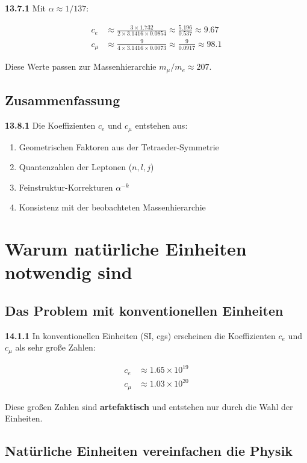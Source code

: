\documentclass[12pt,a4paper]{article}
\begin{document}
\noindent \textbf{13.7.1} Mit $\alpha \approx 1/137$:

\begin{align*}
	c_e &\approx \frac{3 \times 1.732}{2 \times 3.1416 \times 0.0854} \approx \frac{5.196}{0.537} \approx 9.67 \\
	c_\mu &\approx \frac{9}{4 \times 3.1416 \times 0.0073} \approx \frac{9}{0.0917} \approx 98.1
\end{align*}

Diese Werte passen zur Massenhierarchie $m_\mu/m_e \approx 207$.

\subsection{Zusammenfassung}

\noindent \textbf{13.8.1} Die Koeffizienten $c_e$ und $c_\mu$ entstehen aus:
\begin{enumerate}
	\item Geometrischen Faktoren aus der Tetraeder-Symmetrie
	\item Quantenzahlen der Leptonen ($n,l,j$)
	\item Feinstruktur-Korrekturen $\alpha^{-k}$
	\item Konsistenz mit der beobachteten Massenhierarchie
\end{enumerate}


\section{Warum natürliche Einheiten notwendig sind}

\subsection{Das Problem mit konventionellen Einheiten}

\noindent \textbf{14.1.1} In konventionellen Einheiten (SI, cgs) erscheinen die Koeffizienten $c_e$ und $c_\mu$ als sehr große Zahlen:

\begin{align*}
	c_e &\approx 1.65 \times 10^{19} \\
	c_\mu &\approx 1.03 \times 10^{20}
\end{align*}

Diese großen Zahlen sind \textbf{artefaktisch} und entstehen nur durch die Wahl der Einheiten.

\subsection{Natürliche Einheiten vereinfachen die Physik}
\end{document}
